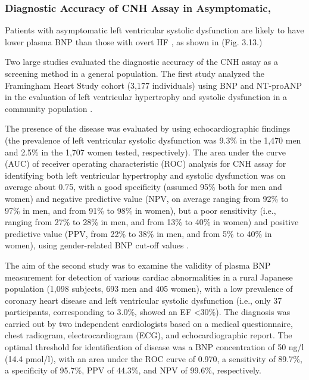 \documentclass[14pt,a4paper,onecolumn]{extarticle}
\begin{document}
\subsubsection{ Diagnostic Accuracy of CNH Assay in Asymptomatic,}

Patients with asymptomatic left ventricular systolic dysfunction are likely to have lower plasma BNP than those with overt HF \citep{bib32} \citep{bib33} \citep{bib34} \citep{bib35} \citep{bib334} \citep{bib335} \citep{bib362} \citep{bib363} \citep{bib364} \citep{bib365} \citep{bib366} \citep{bib372}, as shown in (Fig. 3.13.)

Two large studies \citep{bib39} \citep{bib366} evaluated the diagnostic accuracy of the CNH assay as a screening method in a general population. The first study analyzed the Framingham Heart Study cohort (3,177 individuals) using BNP and NT-proANP in the evaluation of left ventricular hypertrophy and systolic dysfunction in a community population \citep{bib39}.

The presence of the disease was evaluated by using echocardiographic findings (the prevalence of left ventricular systolic dysfunction was 9.3\% in the 1,470 men and 2.5\% in the 1,707 women tested, respectively). The area under the curve (AUC) of receiver operating characteristic (ROC) analysis for CNH assay for identifying both left ventricular hypertrophy and systolic dysfunction was on average about 0.75, with a good specificity (assumed 95\% both for men and women) and negative predictive value (NPV, on average ranging from 92\% to 97\% in men, and from 91\% to 98\% in women), but a poor sensitivity (i.e., ranging from 27\% to 28\% in men, and from 13\% to 40\% in women) and positive predictive value (PPV, from 22\% to 38\% in men, and from 5\% to 40\% in women), using gender-related BNP cut-off values \citep{bib39}.

The aim of the second study was to examine the validity of plasma BNP measurement for detection of various cardiac abnormalities in a rural Japanese population (1,098 subjects, 693 men and 405 women), with a low prevalence of coronary heart disease and left ventricular systolic dysfunction (i.e., only 37 participants, corresponding to 3.0\%, showed an EF <30\%). The diagnosis was carried out by two independent cardiologists based on a medical questionnaire, chest radiogram, electrocardiogram (ECG), and echocardiographic report. The optimal threshold for identification of disease was a BNP concentration of 50 ng/l (14.4 pmol/l), with an area under the ROC curve of 0.970, a sensitivity of 89.7\%, a specificity of 95.7\%, PPV of 44.3\%, and NPV of 99.6\%, respectively. \citep{bib366}
\end{document}
